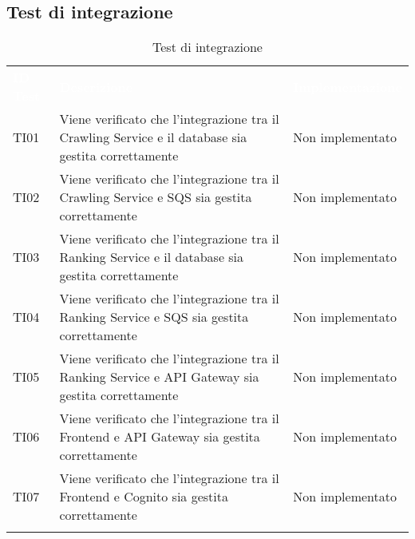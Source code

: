 \subsection{Test di integrazione}
\renewcommand{\arraystretch}{1.5}
\begin{longtable}{ m{}<{\centering}  m{}<{\centering}  m{}<{\centering} }
	\rowcolor{darkblue}
	\textcolor{white}{\textbf{ID Test}} &\textcolor{white}{\textbf{Descrizione}} & \textcolor{white}{\textbf{Implementazione}} \\ 

	TI01 & Viene verificato che l'integrazione tra il Crawling Service e il database sia gestita correttamente & Non implementato \\
    TI02 & Viene verificato che l'integrazione tra il Crawling Service e SQS sia gestita correttamente & Non implementato \\
    TI03 & Viene verificato che l'integrazione tra il Ranking Service e il database sia gestita correttamente & Non implementato \\
    TI04 & Viene verificato che l'integrazione tra il Ranking Service e SQS sia gestita correttamente & Non implementato \\
    TI05 & Viene verificato che l'integrazione tra il Ranking Service e API Gateway sia gestita correttamente & Non implementato \\
    TI06 & Viene verificato che l'integrazione tra il Frontend e API Gateway sia gestita correttamente & Non implementato \\
    TI07 & Viene verificato che l'integrazione tra il Frontend e Cognito sia gestita correttamente & Non implementato \\
    \caption{Test di integrazione}
\end{longtable}	